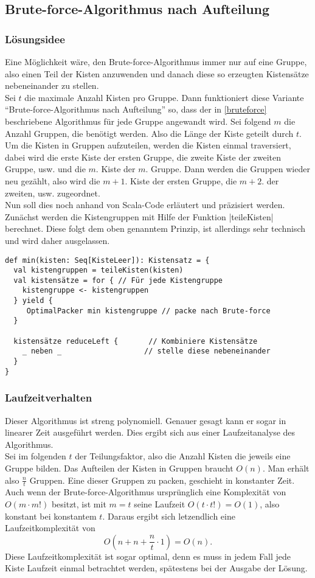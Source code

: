 \subsection{Brute-force-Algorithmus nach Aufteilung}
\subsubsection{Lösungsidee}
 Eine Möglichkeit wäre, den Brute-force-Algorithmus immer nur auf eine Gruppe, also einen Teil der Kisten anzuwenden und danach diese so erzeugten Kistensätze nebeneinander zu stellen.\\
 Sei $t$ die maximale Anzahl Kisten pro Gruppe.
 Dann funktioniert diese Variante ``Brute-force-Algorithmus nach Aufteilung'' so,
 dass der in \ref{bruteforce} beschriebene Algorithmus für jede Gruppe angewandt wird.
 Sei folgend $m$ die Anzahl Gruppen, die benötigt werden. Also die Länge der Kiste geteilt durch $t$.
 Um die Kisten in Gruppen aufzuteilen, werden die Kisten einmal traversiert,
 dabei wird die erste Kiste der ersten Gruppe, die zweite Kiste der zweiten Gruppe, usw. und die $m.$ Kiste der $m.$ Gruppe.
 Dann werden die Gruppen wieder neu gezählt, also wird die $m+1.$ Kiste der ersten Gruppe, die $m+2.$ der zweiten, usw. zugeordnet. \\
 Nun soll dies noch anhand von Scala-Code erläutert und präzisiert werden.
 Zunächst werden die Kistengruppen mit Hilfe der Funktion |teileKisten| berechnet.
 Diese folgt dem oben genanntem Prinzip, ist allerdings sehr technisch und wird daher ausgelassen.
\begin{lstlisting}
def min(kisten: Seq[KisteLeer]): Kistensatz = {
  val kistengruppen = teileKisten(kisten)
  val kistensätze = for { // Für jede Kistengruppe
    kistengruppe <- kistengruppen
  } yield {
     OptimalPacker min kistengruppe // packe nach Brute-force
  }
  
  kistensätze reduceLeft {       // Kombiniere Kistensätze
    _ neben _                   // stelle diese nebeneinander
  }
}
\end{lstlisting}

\subsubsection{Laufzeitverhalten}
 Dieser Algorithmus ist streng polynomiell. Genauer gesagt kann er sogar in linearer Zeit ausgeführt werden.
 Dies ergibt sich aus einer Laufzeitanalyse des Algorithmus. \\
 Sei im folgenden $t$ der Teilungsfaktor, also die Anzahl Kisten die jeweils eine Gruppe bilden.
 Das Aufteilen der Kisten in Gruppen braucht $O(n)$. Man erhält also $\frac{n}{t}$ Gruppen.
 Eine dieser Gruppen zu packen, geschieht in konstanter Zeit. Auch wenn der Brute-force-Algorithmus ursprünglich eine Komplexität von $O(m \cdot m!)$ besitzt,
 ist mit $m=t$ seine Laufzeit $O(t \cdot t!) = O(1)$, also konstant bei konstantem $t$.
 Daraus ergibt sich letzendlich eine Laufzeitkomplexität von \[ O(n + n + \frac{n}{t} \cdot 1) = O(n). \]
 Diese Laufzeitkomplexität ist sogar optimal, denn es muss in jedem Fall jede Kiste Laufzeit einmal betrachtet werden, spätestens bei der Ausgabe der Lösung.
